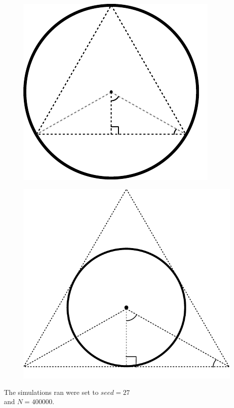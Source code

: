 \documentclass[twocolumn]{article}
\begin{document}
\begin{figure}
	\centering
	\includegraphics[width=0.7\linewidth]{../drawings/p1_3}
	\caption{}
	\label{fig:path3}
\end{figure}

\begin{figure}
	\centering
	\includegraphics[width=0.7\linewidth]{../drawings/p1_4}
	\caption{}
	\label{fig:path4}
\end{figure}






The simulations ran were set to $seed=27$ \\and $N=400000$.
\end{document}
